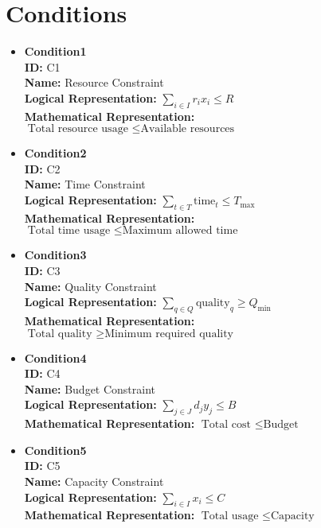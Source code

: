 \documentclass{article}
\begin{document}
\section{Conditions}
\begin{itemize}
    \item \textbf{Condition1} \\
    \textbf{ID:} C1 \\
    \textbf{Name:} Resource Constraint \\
    \textbf{Logical Representation:} $\sum_{i \in I} r_i x_i \leq R$ \\
    \textbf{Mathematical Representation:} $\text{Total resource usage } \leq \text{Available resources}$

    \item \textbf{Condition2} \\
    \textbf{ID:} C2 \\
    \textbf{Name:} Time Constraint \\
    \textbf{Logical Representation:} $\sum_{t \in T} \text{time}_t \leq T_{\text{max}}$ \\
    \textbf{Mathematical Representation:} $\text{Total time usage } \leq \text{Maximum allowed time}$

    \item \textbf{Condition3} \\
    \textbf{ID:} C3 \\
    \textbf{Name:} Quality Constraint \\
    \textbf{Logical Representation:} $\sum_{q \in Q} \text{quality}_q \geq Q_{\text{min}}$ \\
    \textbf{Mathematical Representation:} $\text{Total quality } \geq \text{Minimum required quality}$

    \item \textbf{Condition4} \\
    \textbf{ID:} C4 \\
    \textbf{Name:} Budget Constraint \\
    \textbf{Logical Representation:} $\sum_{j \in J} d_j y_j \leq B$ \\
    \textbf{Mathematical Representation:} $\text{Total cost } \leq \text{Budget}$

    \item \textbf{Condition5} \\
    \textbf{ID:} C5 \\
    \textbf{Name:} Capacity Constraint \\
    \textbf{Logical Representation:} $\sum_{i \in I} x_i \leq C$ \\
    \textbf{Mathematical Representation:} $\text{Total usage } \leq \text{Capacity}$
\end{itemize}
\end{document}
